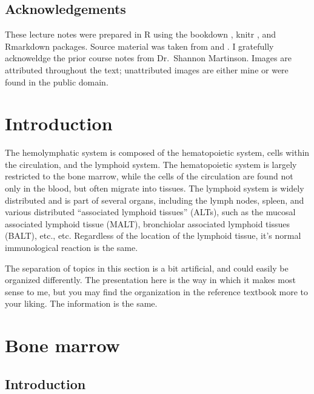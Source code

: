 \documentclass[openany]{article}
\begin{document}
\subsection*{Acknowledgements}\label{acknowledgements}

These lecture notes were prepared in R \citep{R-base} using the bookdown
\citep{xie2015}, knitr \citep{R-knitr}, and Rmarkdown
\citep{R-rmarkdown} packages. Source material was taken from
\citet{zachary2016pathologic} and \citet{maxie2015jubb}. I gratefully
acknoweldge the prior course notes from Dr.~Shannon Martinson. Images
are attributed throughout the text; unattributed images are either mine
or were found in the public domain.

\section{Introduction}\label{intro}

The hemolymphatic system is composed of the hematopoietic system, cells
within the circulation, and the lymphoid system. The hematopoietic
system is largely restricted to the bone marrow, while the cells of the
circulation are found not only in the blood, but often migrate into
tissues. The lymphoid system is widely distributed and is part of
several organs, including the lymph nodes, spleen, and various
distributed ``associated lymphoid tissues'' (ALTs), such as the mucosal
associated lymphoid tissue (MALT), bronchiolar associated lymphoid
tissues (BALT), etc., etc. Regardless of the location of the lymphoid
tissue, it's normal immunological reaction is the same.

The separation of topics in this section is a bit artificial, and could
easily be organized differently. The presentation here is the way in
which it makes most sense to me, but you may find the organization in
the reference textbook more to your liking. The information is the same.

\section{Bone marrow}\label{bone-marrow}

\subsection{Introduction}\label{introduction}
\end{document}

